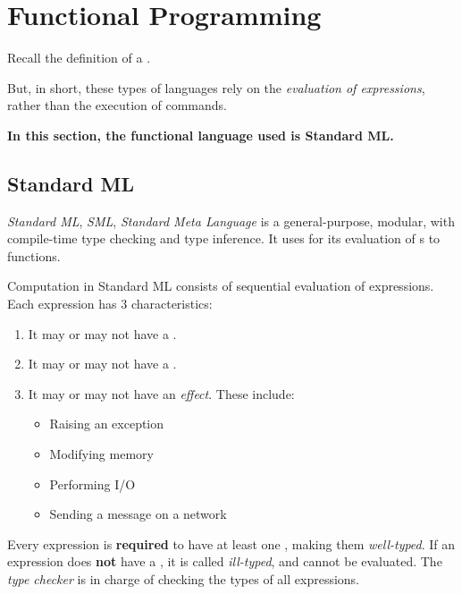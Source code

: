 \section{Functional Programming}\label{sec:Functional_Programming}
Recall the definition of a .

But, in short, these types of languages rely on the \emph{evaluation of expressions}, rather than the execution of commands.

\begin{Large}
  \textbf{In this section, the functional language used is Standard ML.}
\end{Large}

\subsection{Standard ML}\label{subsec:Functional-Standard_ML}
\begin{definition}[Standard ML]\label{def:Standard_ML}
  \emph{Standard ML}, \emph{SML}, \emph{Standard Meta Language} is a general-purpose, modular,  with compile-time type checking and type inference.
  It uses  for its evaluation of s to functions.
\end{definition}

Computation in Standard ML consists of sequential evaluation of expressions.
Each expression has 3 characteristics:
\begin{enumerate}[noitemsep]
\item It may or may not have a \emph{}.
\item It may or may not have a \emph{}.
\item It may or may not have an \emph{effect}. These include:
  \begin{itemize}[noitemsep]
  \item Raising an exception
  \item Modifying memory
  \item Performing I/O
  \item Sending a message on a network
  \end{itemize}
\end{enumerate}

Every expression is \textbf{required} to have at least one , making them \emph{well-typed}.
If an expression does \textbf{not} have a , it is called \emph{ill-typed}, and cannot be evaluated.
The \emph{type checker} is in charge of checking the types of all expressions.

